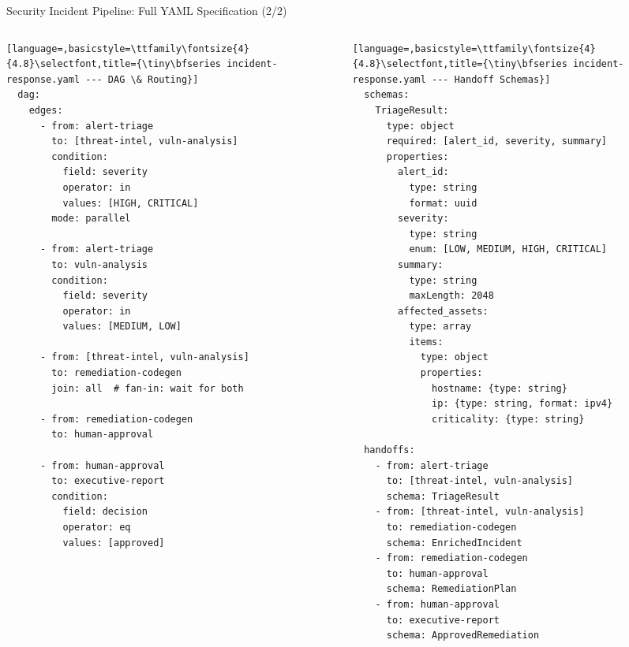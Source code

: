 \begin{frame}[fragile]{\fontsize{11}{13}\selectfont Security Incident Pipeline: Full YAML Specification (2/2)}
  \vspace{-0.4cm}
  \begin{columns}[T]
    \begin{column}{0.50\textwidth}
      \begin{lstlisting}[language=,basicstyle=\ttfamily\fontsize{4}{4.8}\selectfont,title={\tiny\bfseries incident-response.yaml --- DAG \& Routing}]
  dag:
    edges:
      - from: alert-triage
        to: [threat-intel, vuln-analysis]
        condition:
          field: severity
          operator: in
          values: [HIGH, CRITICAL]
        mode: parallel

      - from: alert-triage
        to: vuln-analysis
        condition:
          field: severity
          operator: in
          values: [MEDIUM, LOW]

      - from: [threat-intel, vuln-analysis]
        to: remediation-codegen
        join: all  # fan-in: wait for both

      - from: remediation-codegen
        to: human-approval

      - from: human-approval
        to: executive-report
        condition:
          field: decision
          operator: eq
          values: [approved]
      \end{lstlisting}
    \end{column}
    \begin{column}{0.50\textwidth}
      \begin{lstlisting}[language=,basicstyle=\ttfamily\fontsize{4}{4.8}\selectfont,title={\tiny\bfseries incident-response.yaml --- Handoff Schemas}]
  schemas:
    TriageResult:
      type: object
      required: [alert_id, severity, summary]
      properties:
        alert_id:
          type: string
          format: uuid
        severity:
          type: string
          enum: [LOW, MEDIUM, HIGH, CRITICAL]
        summary:
          type: string
          maxLength: 2048
        affected_assets:
          type: array
          items:
            type: object
            properties:
              hostname: {type: string}
              ip: {type: string, format: ipv4}
              criticality: {type: string}

  handoffs:
    - from: alert-triage
      to: [threat-intel, vuln-analysis]
      schema: TriageResult
    - from: [threat-intel, vuln-analysis]
      to: remediation-codegen
      schema: EnrichedIncident
    - from: remediation-codegen
      to: human-approval
      schema: RemediationPlan
    - from: human-approval
      to: executive-report
      schema: ApprovedRemediation
      \end{lstlisting}
    \end{column}
  \end{columns}
\end{frame}
